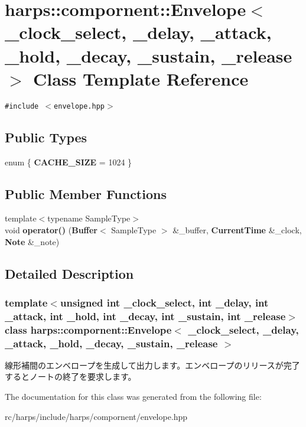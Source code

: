 \section{harps::compornent::Envelope$<$ \_\-clock\_\-select, \_\-delay, \_\-attack, \_\-hold, \_\-decay, \_\-sustain, \_\-release $>$ Class Template Reference}
\label{classharps_1_1compornent_1_1Envelope}
{\tt \#include $<$envelope.hpp$>$}

\subsection*{Public Types}
\begin{CompactItemize}
\item 
enum \{ \textbf{CACHE\_\-SIZE} =  1024
 \}
\end{CompactItemize}
\subsection*{Public Member Functions}
\begin{CompactItemize}
\item 
{\footnotesize template$<$typename SampleType$>$ }\\void \textbf{operator()} ({\bf Buffer}$<$ SampleType $>$ \&\_\-buffer, {\bf CurrentTime} \&\_\-clock, {\bf Note} \&\_\-note)\label{classharps_1_1compornent_1_1Envelope_b0f272cb8a1268f8b81979d6b48ce46e}

\end{CompactItemize}


\subsection{Detailed Description}
\subsubsection*{template$<$unsigned int \_\-clock\_\-select, int \_\-delay, int \_\-attack, int \_\-hold, int \_\-decay, int \_\-sustain, int \_\-release$>$ class harps::compornent::Envelope$<$ \_\-clock\_\-select, \_\-delay, \_\-attack, \_\-hold, \_\-decay, \_\-sustain, \_\-release $>$}

線形補間のエンベロープを生成して出力します。エンベロープのリリースが完了するとノートの終了を要求します。 

The documentation for this class was generated from the following file:\begin{CompactItemize}
\item 
rc/harps/include/harps/compornent/envelope.hpp\end{CompactItemize}
